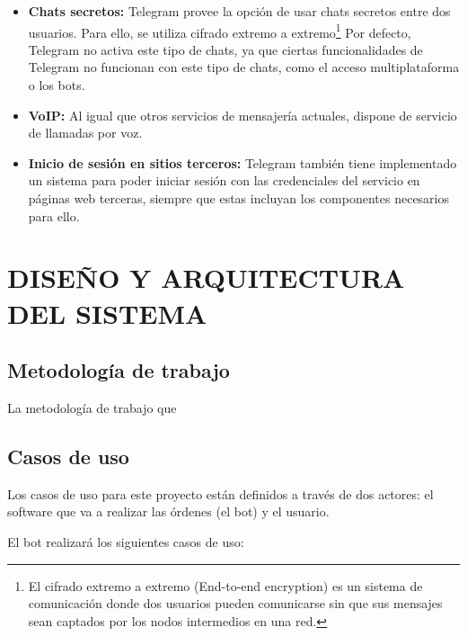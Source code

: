 \documentclass[spanish,12pt, a4paper, twoside]{paper}
\let\oldsection\section
\def\section{\cleardoublepage\oldsection}
\begin{document}
\begin{itemize}
\item \textbf{Chats secretos:} Telegram provee la opción de usar chats secretos entre dos usuarios. Para ello, se utiliza cifrado extremo a extremo\footnote{El cifrado extremo a extremo (End-to-end encryption) es un sistema de comunicación donde dos usuarios pueden comunicarse sin que sus mensajes sean captados por los nodos intermedios en una red.} Por defecto, Telegram no activa este tipo de chats, ya que ciertas funcionalidades de Telegram no funcionan con este tipo de chats, como el acceso multiplataforma o los bots.

\item \textbf{VoIP:} Al igual que otros servicios de mensajería actuales, dispone de servicio de llamadas por voz. 

\item \textbf{Inicio de sesión en sitios terceros:} Telegram también tiene implementado un sistema para poder iniciar sesión con las credenciales del servicio en páginas web terceras, siempre que estas incluyan los componentes necesarios para ello. 

\end{itemize}

\section{DISEÑO Y ARQUITECTURA DEL SISTEMA}

\subsection{Metodología de trabajo}

La metodología de trabajo que 

\subsection{Casos de uso}

Los casos de uso para este proyecto están definidos a través de dos actores: el software que va a realizar las órdenes (el bot) y el usuario.

El bot realizará los siguientes casos de uso:
\end{document}
